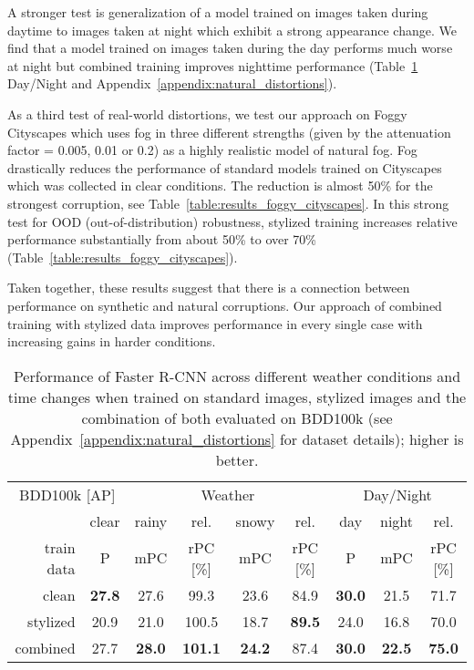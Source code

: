 \documentclass{article}
\newcommand{\highlight}[1]{{\cellcolor{gray.220} #1}}
\begin{document}
A stronger test is generalization of a model trained on images taken during daytime to images taken at night which exhibit a strong appearance change. We find that a model trained on images taken during the day performs much worse at night but combined training improves nighttime performance (Table~\ref{table:results_bdd100k} Day/Night and Appendix~\ref{appendix:natural_distortions}).

As a third test of real-world distortions, we test our approach on Foggy Cityscapes \cite{Sakaridis18foggycityscapes} which uses fog in three different strengths (given by the attenuation factor  = 0.005, 0.01 or 0.2) as a highly realistic model of natural fog. Fog drastically reduces the performance of standard models trained on Cityscapes which was collected in clear conditions. The reduction is almost 50\% for the strongest corruption, see Table~\ref{table:results_foggy_cityscapes}. In this strong test for OOD (out-of-distribution) robustness, stylized training increases relative performance substantially from about 50\% to over 70\% (Table~\ref{table:results_foggy_cityscapes}).

Taken together, these results suggest that there is a connection between performance on synthetic and natural corruptions. Our approach of combined training with stylized data improves performance in every single case with increasing gains in harder conditions.

\begin{table}[t]\footnotesize
\begin{center}
\begin{tabular}{r|c|cc|cc||c|cc}
\toprule
\multicolumn{2}{c|}{BDD100k [AP]} & \multicolumn{4}{c||}{Weather}& \multicolumn{3}{c}{Day/Night} \\
& clear & \highlight{rainy} & rel. & \highlight{snowy} & rel. & day & \highlight{night} & rel.\\
train data & P & \highlight{mPC} & rPC [\%] & \highlight{mPC} & rPC [\%] & P & \highlight{mPC} & rPC [\%] \\
\hline
clean & \textbf{27.8} & \highlight{27.6} & 99.3  & \highlight{23.6} & 84.9 & \textbf{30.0} & \highlight{21.5} & 71.7 \\
\hline
stylized & 20.9 & \highlight{21.0} & 100.5 & \highlight{18.7} & \textbf{89.5} & 24.0 & \highlight{16.8} & 70.0\\
combined & 27.7 & \highlight{\textbf{28.0}} & \textbf{101.1}  & \highlight{\textbf{24.2}} & 87.4 & \textbf{30.0} & \highlight{\textbf{22.5}} & \textbf{75.0}\\
\bottomrule
\end{tabular}
\caption{Performance of Faster R-CNN across different weather conditions and time changes when trained on standard images, stylized images and the combination of both evaluated on BDD100k (see Appendix~\ref{appendix:natural_distortions} for dataset details); higher is better.}
\label{table:results_bdd100k}
\vspace{-0.3cm}
\end{center}
\end{table}
\end{document}
